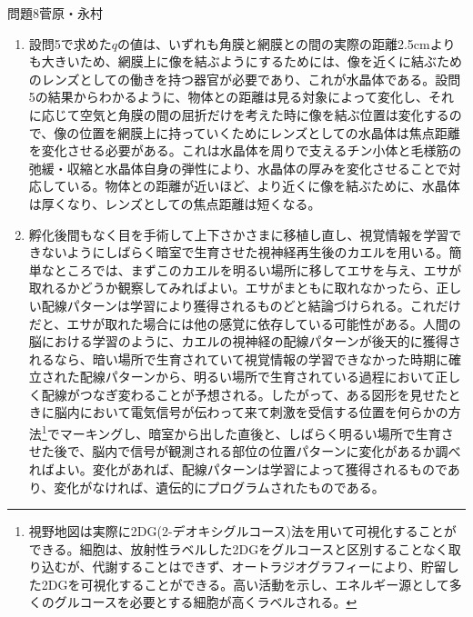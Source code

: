 \documentclass[fleqn]{jbook}
\begin{document}
\begin{answer}{問題8}{菅原・永村}
\begin{enumerate}
問題に与えられているように、
$n_2/n_1 = 1.34$、$1/r = 1/0.80 = 1.25 \> $(1/cm)なので、
\begin{eqnarray}
q = \frac{1.34}{0.34 \times 1.25 -\frac{1}{p}}
\end{eqnarray}
$p = 25 \> $(cm)のとき、$1/p = 0.04 \> $(1/cm)
\begin{eqnarray}
q_{\mbox{{\tiny opt}}} = \frac{1.34}{0.34 \times 1.25 - 0.04} = 3.48 \cdots \simeq 3.5
\end{eqnarray}
$p = \infty $のとき、$1/p = 0$
\begin{eqnarray}
q_{\mbox{{\tiny inf}}} = \frac{1.34}{0.34 \times 1.25} = 3.15 \cdots \simeq 3.2
\end{eqnarray}
したがって、
$p = 25 \> $(cm)のとき$q_{\mbox{{\tiny opt}}} = 3.5 \> $(cm)、
$p = \infty \> $のとき$q_{\mbox{{\tiny int}}} = 3.2 \> $(cm)
\item 設問5で求めた$q$の値は、いずれも角膜と網膜との間の実際の距離2.5cmよりも大きいため、網膜上に像を結ぶようにするためには、像を近くに結ぶためのレンズとしての働きを持つ器官が必要であり、これが水晶体である。設問5の結果からわかるように、物体との距離は見る対象によって変化し、それに応じて空気と角膜の間の屈折だけを考えた時に像を結ぶ位置は変化するので、像の位置を網膜上に持っていくためにレンズとしての水晶体は焦点距離を変化させる必要がある。これは水晶体を周りで支えるチン小体と毛様筋の弛緩・収縮と水晶体自身の弾性により、水晶体の厚みを変化させることで対応している。物体との距離が近いほど、より近くに像を結ぶために、水晶体は厚くなり、レンズとしての焦点距離は短くなる。
\item 孵化後間もなく目を手術して上下さかさまに移植し直し、視覚情報を学習できないようにしばらく暗室で生育させた視神経再生後のカエルを用いる。簡単なところでは、まずこのカエルを明るい場所に移してエサを与え、エサが取れるかどうか観察してみればよい。エサがまともに取れなかったら、正しい配線パターンは学習により獲得されるものどと結論づけられる。これだけだと、エサが取れた場合には他の感覚に依存している可能性がある。人間の脳における学習のように、カエルの視神経の配線パターンが後天的に獲得されるなら、暗い場所で生育されていて視覚情報の学習できなかった時期に確立された配線パターンから、明るい場所で生育されている過程において正しく配線がつなぎ変わることが予想される。したがって、ある図形を見せたときに脳内において電気信号が伝わって来て刺激を受信する位置を何らかの方法\footnote{視野地図は実際に2DG(2-デオキシグルコース)法を用いて可視化することができる。細胞は、放射性ラベルした2DGをグルコースと区別することなく取り込むが、代謝することはできず、オートラジオグラフィーにより、貯留した2DGを可視化することができる。高い活動を示し、エネルギー源として多くのグルコースを必要とする細胞が高くラベルされる。}でマーキングし、暗室から出した直後と、しばらく明るい場所で生育させた後で、脳内で信号が観測される部位の位置パターンに変化があるか調べればよい。変化があれば、配線パターンは学習によって獲得されるものであり、変化がなければ、遺伝的にプログラムされたものである。

\end{enumerate}
\end{answer}
\end{document}
